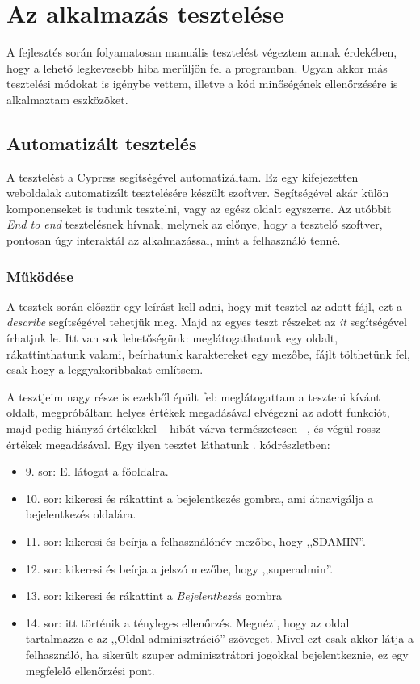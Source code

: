 \documentclass[
]{thesis-ekf}
\theoremstyle{definition}
\theoremstyle{remark}
\begin{document}


\chapter{Az alkalmazás tesztelése}
\label{testing}

A fejlesztés során folyamatosan manuális tesztelést végeztem annak érdekében, hogy a lehető legkevesebb hiba merüljön fel a programban. Ugyan akkor más tesztelési módokat is igénybe vettem, illetve a kód minőségének ellenőrzésére is alkalmaztam eszközöket.

\section{Automatizált tesztelés}

A tesztelést a Cypress\cite{cypress} segítségével automatizáltam. Ez egy kifejezetten weboldalak automatizált tesztelésére készült szoftver. Segítségével akár külön komponenseket is tudunk tesztelni, vagy az egész oldalt egyszerre. Az utóbbit \emph{End to end} tesztelésnek hívnak, melynek az előnye, hogy a tesztelő szoftver, pontosan úgy interaktál az alkalmazással, mint a felhasználó tenné. \cite{e2e}

\subsection{Működése}

A tesztek során először egy leírást kell adni, hogy mit tesztel az adott fájl, ezt a \emph{describe} segítségével tehetjük meg. Majd az egyes teszt részeket az \emph{it} segítségével írhatjuk le. Itt van sok lehetőségünk: meglátogathatunk egy oldalt, rákattinthatunk valami, beírhatunk karaktereket egy mezőbe, fájlt tölthetünk fel, csak hogy a leggyakoribbakat említsem.

A tesztjeim nagy része is ezekből épült fel: meglátogattam a teszteni kívánt oldalt, megpróbáltam helyes értékek megadásával elvégezni az adott funkciót, majd pedig hiányzó értékekkel -- hibát várva természetesen --, és végül rossz értékek megadásával. Egy ilyen tesztet láthatunk . kódrészletben:
\begin{itemize}
	\item 9. sor: El látogat a főoldalra.
	\item 10. sor: kikeresi és rákattint a bejelentkezés gombra, ami átnavigálja a bejelentkezés oldalára.
	\item 11. sor: kikeresi és beírja a felhasználónév mezőbe, hogy ,,SDAMIN''.
	\item 12. sor: kikeresi és beírja a jelszó mezőbe, hogy ,,superadmin''.
	\item 13. sor: kikeresi és rákattint a \emph{Bejelentkezés} gombra
	\item 14. sor: itt történik a tényleges ellenőrzés. Megnézi, hogy az oldal tartalmazza-e az ,,Oldal adminisztráció'' szöveget. Mivel ezt csak akkor látja a felhasználó, ha sikerült szuper adminisztrátori jogokkal bejelentkeznie, ez egy megfelelő ellenőrzési pont.
\end{itemize}
\end{document}
